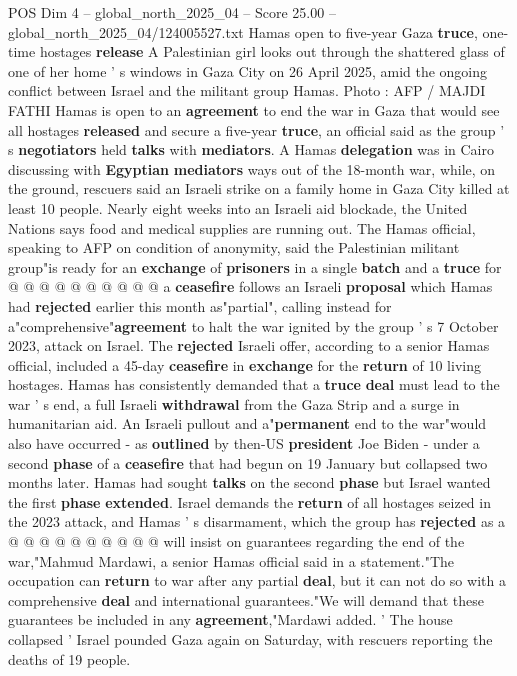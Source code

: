 \begin{textsample}{POS Dim 4 – global\_north\_2025\_04 – Score 25.00 – global\_north\_2025\_04/124005527.txt}  \label{ex:f4_pos_214}
Hamas open to five-year Gaza \textbf{truce}, one-time hostages \textbf{release} A Palestinian girl looks out through the shattered glass of one of her home ' s windows in Gaza City on 26 April 2025, amid the ongoing conflict between Israel and the militant group Hamas.
Photo : AFP / MAJDI FATHI Hamas is open to an \textbf{agreement} to end the war in Gaza that would see all hostages \textbf{released} and secure a five-year \textbf{truce}, an official said as the group ' s \textbf{negotiators} held \textbf{talks} with \textbf{mediators}.
A Hamas \textbf{delegation} was in Cairo discussing with \textbf{Egyptian} \textbf{mediators} ways out of the 18-month war, while, on the ground, rescuers said an Israeli strike on a family home in Gaza City killed at least 10 people.
Nearly eight weeks into an Israeli aid blockade, the United Nations says food and medical supplies are running out.
The Hamas official, speaking to AFP on condition of anonymity, said the Palestinian militant group"is ready for an \textbf{exchange} of \textbf{prisoners} in a single \textbf{batch} and a \textbf{truce} for @ @ @ @ @ @ @ @ @ @ a \textbf{ceasefire} follows an Israeli \textbf{proposal} which Hamas had \textbf{rejected} earlier this month as"partial", calling instead for a"comprehensive"\textbf{agreement} to halt the war ignited by the group ' s 7 October 2023, attack on Israel.
The \textbf{rejected} Israeli offer, according to a senior Hamas official, included a 45-day \textbf{ceasefire} in \textbf{exchange} for the \textbf{return} of 10 living hostages.
Hamas has consistently demanded that a \textbf{truce} \textbf{deal} must lead to the war ' s end, a full Israeli \textbf{withdrawal} from the Gaza Strip and a surge in humanitarian aid.
An Israeli pullout and a"\textbf{permanent} end to the war"would also have occurred - as \textbf{outlined} by then-US \textbf{president} Joe Biden - under a second \textbf{phase} of a \textbf{ceasefire} that had begun on 19 January but collapsed two months later.
Hamas had sought \textbf{talks} on the second \textbf{phase} but Israel wanted the first \textbf{phase} \textbf{extended}.
Israel demands the \textbf{return} of all hostages seized in the 2023 attack, and Hamas ' s disarmament, which the group has \textbf{rejected} as a @ @ @ @ @ @ @ @ @ @ will insist on guarantees regarding the end of the war,"Mahmud Mardawi, a senior Hamas official said in a statement."The occupation can \textbf{return} to war after any partial \textbf{deal}, but it can not do so with a comprehensive \textbf{deal} and international guarantees."We will demand that these guarantees be included in any \textbf{agreement},"Mardawi added. ' The house collapsed ' Israel pounded Gaza again on Saturday, with rescuers reporting the deaths of 19 people.

\end{textsample}
